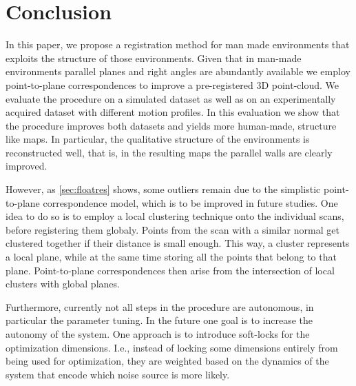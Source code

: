 \section{Conclusion}

In this paper, we propose a registration method for man made environments that exploits the structure of those environments. 
Given that in man-made environments parallel planes and right angles are abundantly available we employ point-to-plane correspondences to improve a pre-registered 3D point-cloud. 
We evaluate the procedure on a simulated dataset as well as on an experimentally acquired dataset with different motion profiles. 
In this evaluation we show that the procedure improves both datasets and yields more human-made, structure like maps. 
In particular, the qualitative structure of the environments is reconstructed well, that is, in the resulting maps the parallel walls are clearly improved.

However, as \ref{sec:floatres} shows, some outliers remain due to the simplistic point-to-plane correspondence model, which is to be improved in future studies.
One idea to do so is to employ a local clustering technique onto the individual scans, before registering them globaly. 
Points from the scan with a similar normal get clustered together if their distance is small enough.
This way, a cluster represents a local plane, while at the same time storing all the points that belong to that plane.
Point-to-plane correspondences then arise from the intersection of local clusters with global planes.

Furthermore, currently not all steps in the procedure are autonomous, in particular the parameter tuning. 
In the future one goal is to increase the autonomy of the system.
One approach is to introduce soft-locks for the optimization dimensions.
I.e., instead of locking some dimensions entirely from being used for optimization, they are weighted based on the dynamics of the system that encode which noise source is more likely.  

